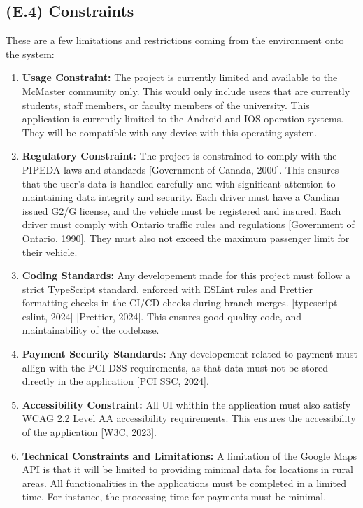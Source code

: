 \documentclass[12pt,letterpaper]{article}
\begin{document}
\subsection{(E.4) Constraints}
These are a few limitations and restrictions coming from the environment onto the system: 
\begin{enumerate}
\item \textbf{Usage Constraint:} The project is currently limited and available to the McMaster community only. This would only include users that are currently students, staff members, or faculty members of the university. This application is currently limited to the Android and IOS operation systems. They will be compatible with any device with this operating system.
\item \textbf{Regulatory Constraint:} The project is constrained to comply with the PIPEDA laws and standards [Government of Canada, 2000]. This ensures that the user's data is handled carefully and with significant attention to maintaining data integrity and security. Each driver must have a Candian issued G2/G license, and the vehicle must be registered and insured. Each driver must comply with Ontario traffic rules and regulations [Government of Ontario, 1990]. They must also not exceed the maximum passenger limit for their vehicle.
\item \textbf{Coding Standards:} Any developement made for this project must follow a strict TypeScript standard, enforced with ESLint rules and Prettier formatting checks in the CI/CD checks during branch merges. [typescript-eslint, 2024] [Prettier, 2024]. This ensures good quality code, and maintainability of the codebase. 
\item \textbf{Payment Security Standards:} Any developement related to payment must allign with the PCI DSS requirements, as that data must not be stored directly in the application [PCI SSC, 2024].
\item \textbf{Accessibility Constraint:} All UI whithin the application must also satisfy WCAG 2.2 Level AA accessibility requirements. This ensures the accessibility of the application [W3C, 2023].
\item \textbf{Technical Constraints and Limitations:} A limitation of the Google Maps API is that it will be limited to providing minimal data for locations in rural areas. All functionalities in the applications must be completed in a limited time. For instance, the processing time for payments must be minimal. 
\end{enumerate}
\end{document}
